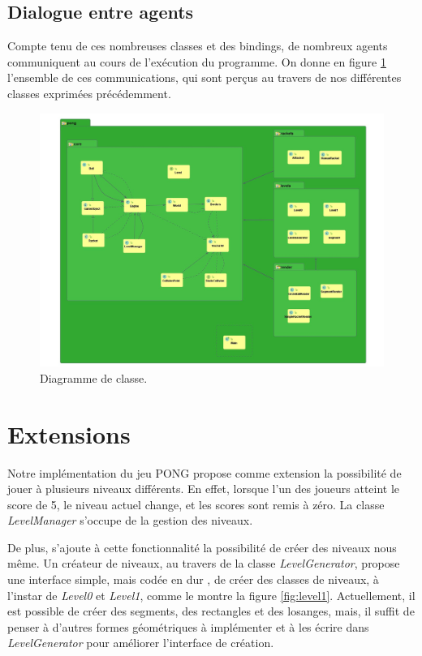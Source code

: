 \documentclass[a4paper,10pt]{article}
\theoremstyle{definition}
\begin{document}
    \subsection{Dialogue entre agents}
    
    Compte tenu de ces nombreuses classes et des bindings, de nombreux agents communiquent au cours de l'exécution du programme. On donne en figure \ref{fig:diag} l'ensemble de ces communications, qui sont perçus au travers de nos différentes classes exprimées précédemment.
    	\begin{figure}[!h]
  	  \begin{center}
    	    \includegraphics[width=\textwidth]{Class_diagram.jpg}
    	    \caption{Diagramme de classe.}
    	    \label{fig:diag}
  	  \end{center}
	\end{figure}	

\section{Extensions}
	Notre implémentation du jeu PONG propose comme extension la possibilité de jouer à plusieurs niveaux différents. En effet, lorsque l'un des joueurs atteint le score de 5, le niveau actuel change, et les scores sont remis à zéro. La classe \emph{LevelManager} s'occupe de la gestion des niveaux.
	
	De plus, s'ajoute à cette fonctionnalité la possibilité de créer des niveaux nous même. Un créateur de niveaux, au travers de la classe \emph{LevelGenerator}, propose une interface simple, mais \og codée en dur \fg{}, de créer des classes de niveaux, à l'instar de \emph{Level0} et \emph{Level1}, comme le montre la figure \ref{fig:level1}. Actuellement, il est possible de créer des segments, des rectangles et des losanges, mais, il suffit de penser à d'autres formes géométriques à implémenter et à les écrire dans \emph{LevelGenerator} pour améliorer l'interface de création. 
		
\end{document}
